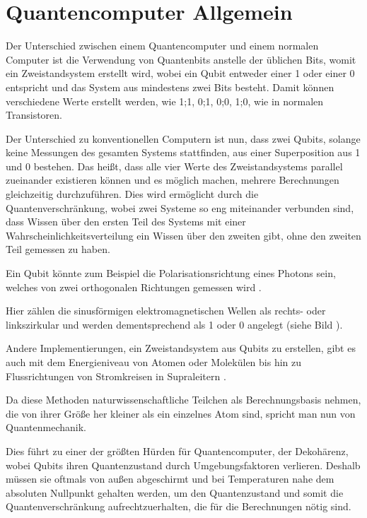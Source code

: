 \section*{Quantencomputer Allgemein}

Der Unterschied zwischen einem Quantencomputer und einem normalen Computer ist die Verwendung von Quantenbits \cite{quantencomputer_2024} anstelle der üblichen Bits, womit ein Zweistandsystem \cite{zweizustandssystem_nodate} erstellt wird, wobei ein Qubit entweder einer 1 oder einer 0 entspricht und das System aus mindestens zwei Bits besteht. Damit können verschiedene Werte erstellt werden, wie 1;1, 0;1, 0;0, 1;0, wie in normalen Transistoren.

Der Unterschied zu konventionellen Computern ist nun, dass zwei Qubits, solange keine Messungen des gesamten Systems stattfinden, aus einer Superposition aus 1 und 0 bestehen. 
Das heißt, dass alle vier Werte des Zweistandsystems parallel zueinander existieren können und es möglich machen, mehrere Berechnungen gleichzeitig durchzuführen.\cite{What_is_quantum_computing_nodate}
Dies wird ermöglicht durch die Quantenverschränkung, wobei zwei Systeme so eng miteinander verbunden sind, dass Wissen über den ersten Teil des Systems mit einer Wahrscheinlichkeitsverteilung ein Wissen über den zweiten gibt, ohne den zweiten Teil gemessen zu haben.\cite{quantenverschrankung_2024}

Ein Qubit könnte zum Beispiel die Polarisationsrichtung eines Photons sein, welches von zwei orthogonalen Richtungen gemessen wird \cite{What_is_quantum_computing_nodate}. 

Hier zählen die sinusförmigen elektromagnetischen Wellen als rechts- oder linkszirkular und werden dementsprechend als 1 oder 0 angelegt (siehe Bild \cite{electromagnetic_2024}).


Andere Implementierungen, ein Zweistandsystem aus Qubits zu erstellen, gibt es auch mit dem Energieniveau von Atomen oder Molekülen bis hin zu Flussrichtungen von Stromkreisen in Supraleitern \cite{supraleitung_nodate}.

Da diese Methoden naturwissenschaftliche Teilchen als Berechnungsbasis nehmen, die von ihrer Größe her kleiner als ein einzelnes Atom sind, spricht man nun von Quantenmechanik. 

Dies führt zu einer der größten Hürden für Quantencomputer, der Dekohärenz, wobei Qubits ihren Quantenzustand durch Umgebungsfaktoren verlieren. Deshalb müssen sie oftmals von außen abgeschirmt und bei Temperaturen nahe dem absoluten Nullpunkt gehalten werden, um den Quantenzustand und somit die Quantenverschränkung aufrechtzuerhalten, die für die Berechnungen nötig sind.

